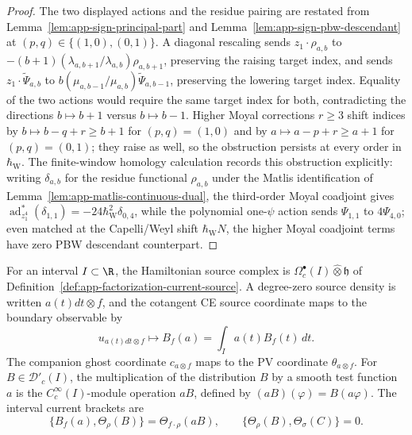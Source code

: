 \begin{proof}
  The two displayed actions and the residue pairing are restated from
  Lemma~\ref{lem:app-sign-principal-part} and
  Lemma~\ref{lem:app-sign-pbw-descendant} at
  \((p,q)\in\{(1,0),(0,1)\}\).  A diagonal rescaling sends
  \(z_1\cdot\rho_{a,b}\) to
  \(-(b+1)(\lambda_{a,b+1}/\lambda_{a,b})\rho_{a,b+1}\), preserving the
  raising target index, and sends
  \(z_1\cdot\widetilde\Psi_{a,b}\) to
  \(b(\mu_{a,b-1}/\mu_{a,b})\widetilde\Psi_{a,b-1}\), preserving the
  lowering target index.  Equality of the two actions would require the same
  target index for both, contradicting the directions
  \(b\mapsto b+1\) versus \(b\mapsto b-1\).  Higher Moyal corrections
  \(r\geq3\) shift indices by \(b\mapsto b-q+r\geq b+1\) for
  \((p,q)=(1,0)\) and by \(a\mapsto a-p+r\geq a+1\) for
  \((p,q)=(0,1)\); they raise as well, so the obstruction persists at
  every order in \(\hbar_{\mathrm{W}}\).  The finite-window homology calculation
  records this obstruction explicitly: writing \(\delta_{a,b}\) for the residue
  functional \(\rho_{a,b}\) under the Matlis identification of
  Lemma~\ref{lem:app-matlis-continuous-dual}, the third-order Moyal
  coadjoint gives
  \(\operatorname{ad}^*_{z_1^4}(\delta_{1,1})=-24\hbar_{\mathrm{W}}^2\delta_{0,4}\),
  while the polynomial one-\(\psi\) action sends \(\Psi_{1,1}\) to
  \(4\Psi_{4,0}\); even matched at the Capelli/Weyl shift \(\hbar_{\mathrm{W}} N\),
  the higher Moyal coadjoint terms have zero PBW descendant counterpart.
\end{proof}

\begin{lem}
\label{lem:app-sign-current-source}
  For an interval \(I\subset\R\), the Hamiltonian source complex is
  \(\Omega^\bullet_c(I)\widehat\otimes\mathfrak h\) of
  Definition~\ref{def:app-factorization-current-source}.  A
  degree-zero source density is written \(a(t)dt\otimes f\), and the
  cotangent CE source coordinate maps to the boundary observable by
  \[
    u_{a(t)dt\otimes f}\longmapsto
    B_f(a)=\int_Ia(t)B_f(t)\,dt.
  \]
  The companion ghost coordinate \(c_{a\otimes f}\) maps to the PV
  coordinate \(\theta_{a\otimes f}\).  For
  \(B\in\mathcal D'_c(I)\), the multiplication of the distribution
  \(B\) by a smooth test function \(a\) is the
  \(C_c^\infty(I)\)-module operation \(aB\), defined by
  \((aB)(\varphi)=B(a\varphi)\).  The interval current brackets are
  \[
    \{B_f(a),\Theta_\rho(B)\}=\Theta_{f\cdot\rho}(aB),\qquad
    \{\Theta_\rho(B),\Theta_\sigma(C)\}=0.
  \]
\end{lem}

